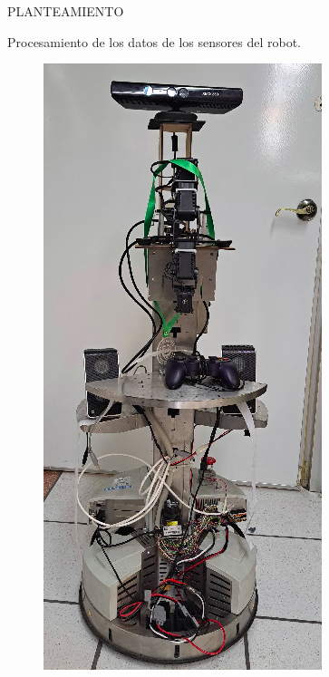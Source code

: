 \documentclass[handout,t]{beamer}
\begin{document}
\begin{frame}{PLANTEAMIENTO}

Procesamiento de los datos de los sensores del robot.\\
\begin{figure}[htp]
    \includegraphics[scale=0.25]{NewerFigures/FestinoNew.png}
    \label{fig:FestinoNew}
\end{figure}
\end{frame}


\end{document}
